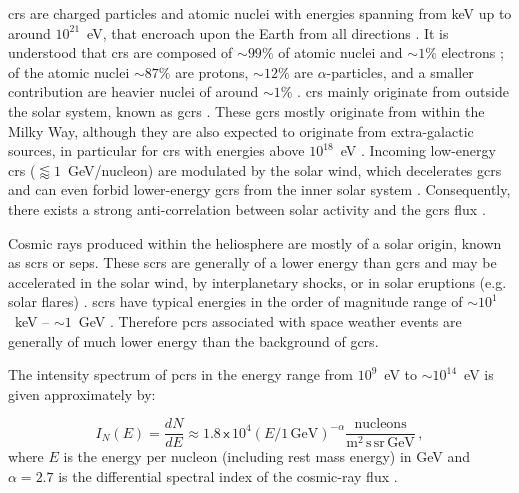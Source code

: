 \glspl{cr} are charged particles and atomic nuclei with energies spanning from keV up to around $10^{21}$~eV, that encroach upon the Earth from all directions \citep{giacalone_energetic_2010}. It is understood that \glspl{cr} are composed of $\sim99\%$ of atomic nuclei and $\sim1\%$ electrons \citep{gaisser_cosmic_2016}; of the atomic nuclei $\sim87\%$ are protons, $\sim12\%$ are $\alpha$-particles, and a smaller contribution are heavier nuclei of around $\sim1\%$ \citep{grupen_astroparticle_2005, dunai_cosmic_2010, particle_data_group_review_2020}. \glspl{cr} mainly originate from outside the solar system, known as \glspl{gcr} \citep{particle_data_group_review_2020}. These \glspl{gcr} mostly originate from within the Milky Way, although they are also expected to originate from extra-galactic sources, in particular for \glspl{cr} with energies above $10^{18}$~eV \citep{aab_observation_2017}. Incoming low-energy \glspl{cr} ($\lessapprox1$~GeV/nucleon) are modulated by the solar wind, which decelerates \glspl{gcr} and can even forbid lower-energy \glspl{gcr} from the inner solar system \citep{grupen_astroparticle_2005}. Consequently, there exists a strong anti-correlation between solar activity and the \glspl{gcr} flux \citep{particle_data_group_review_2020}.

Cosmic rays produced within the heliosphere are mostly of a solar origin, known as \glspl{scr} or \glspl{sep}. These \glspl{scr} are generally of a lower energy than \glspl{gcr} and may be accelerated in the solar wind, by interplanetary shocks, or in solar eruptions (e.g. solar flares) \citep{giacalone_energetic_2010}. \glspl{scr} have typical energies in the order of magnitude range of $\sim10^{1}$~keV -- $\sim1$~GeV \citep{chilingarian_galactic_2003, bruno_solar_2018}. Therefore \glspl{pcr} associated with space weather events are generally of much lower energy than the background of \glspl{gcr}.

The intensity spectrum of \glspl{pcr} in the energy range from $10^9$~eV to $\sim10^{14}$~eV is given approximately by:

\begin{equation}
\label{eq:CR_flux}
I_N(E) = \frac{dN}{dE} \approx 1.8 \, \mathsf{x} \, 10^4 (E/1 \, \mathrm{GeV})^{-\alpha} \frac{\mathrm{nucleons}}{{\mathrm{m^2 \, s  \, sr \, GeV}}} \, ,
\end{equation}
%
where $E$ is the energy per nucleon (including rest mass energy) in GeV and $\alpha=2.7$ is the differential spectral index of the cosmic-ray flux \citep{particle_data_group_review_2020}. 

